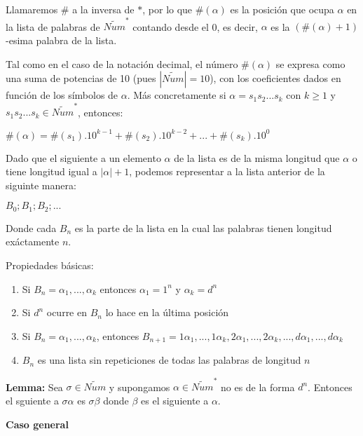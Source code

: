 \documentclass{article}
\begin{document}
\begin{flushleft}
Llamaremos $\#$ a la inversa de $*$, por lo que $\#(\alpha)$ es la posición que ocupa $\alpha$ en la lista de palabras de $\widetilde{Num}^*$ contando desde el 0, es decir, $\alpha$ es la $(\#(\alpha)+1)$-esima palabra de la lista.\linebreak

Tal como en el caso de la notación decimal, el número $\#(\alpha)$ se expresa como una suma de potencias de 10 (pues $|\widetilde{Num}| = 10$), con los coeficientes dados en función de los símbolos de $\alpha$. Más concretamente si $\alpha = s_1s_2...s_k$ con $k \geq 1$ y $s_1s_2...s_k \in \widetilde{Num}^*$, entonces:
\begin{center}
    $\#(\alpha) = \#(s_1).10^{k-1} + \#(s_2).10^{k-2} + ... + \#(s_k).10^0$ 
\end{center}

Dado que el siguiente a un elemento  $\alpha$ de la lista es de la misma longitud que $\alpha$ o tiene longitud igual a $|\alpha| + 1$, podemos representar a la lista anterior de la siguinte manera:
\begin{center}
    $B_0;B_1;B_2;...$
\end{center}
Donde cada $B_n$ es la parte de la lista en la cual las palabras tienen longitud exáctamente $n$. \linebreak

Propiedades básicas:
\begin{enumerate}
    \item Si $B_n = \alpha_1, ..., \alpha_k$ entonces $\alpha_1 = 1^n$ y $\alpha_k = d^n$ 
    \item Si $d^n$ ocurre en $B_n$ lo hace en la última posición
    \item Si $B_n = \alpha_1, ..., \alpha_k$, entonces $B_{n+1} = 1\alpha_1, ..., 1\alpha_k, 2\alpha_1, ..., 2\alpha_k, ..., d\alpha_1, ..., d\alpha_k$
    \item $B_n$ es una lista sin repeticiones de todas las palabras de longitud $n$
\end{enumerate}

\textbf{Lemma:} Sea $\sigma \in \widetilde{Num}$ y supongamos $\alpha \in \widetilde{Num}^*$ no es de la forma $d^n$. Entonces el sguiente a $\sigma\alpha$ es $\sigma\beta$ donde $\beta$ es el siguiente a $\alpha$.\pagebreak

\begin{Large}\textbf{Caso general}\end{Large}\linebreak


\end{flushleft}
\end{document}

